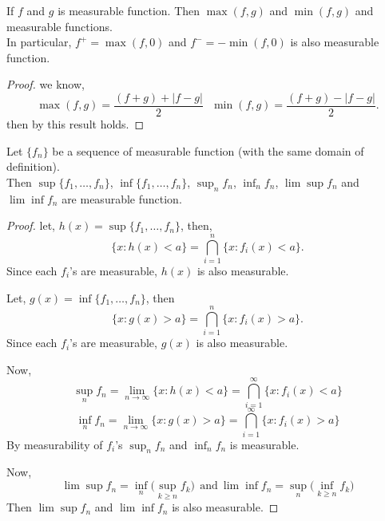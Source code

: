 \begin{corollary}
    If $f$ and  $g$ is measurable function. Then  $\max(f,g)$ and  $\min(f,g)$ and measurable functions.\\
    In particular,  $f^{+}=\max(f,0)$ and $f^{-}=-\min(f,0)$ is also measurable function.
\end{corollary}
\begin{proof}
    we know,
    \begin{equation}
        \max(f,g)=\frac{(f+g)+|f-g|}{2} \ \ \ \min(f,g)=\frac{(f+g)-|f-g|}{2}.
    \end{equation}
    then by  this result holds.
\end{proof}

\begin{theorem}
    Let $\{f_n\}$ be a sequence of measurable function (with the same domain of definition).\\
    Then  $\sup\{f_1,\ldots,f_n\}$, $\inf\{f_1,\ldots,f_n\}$, $\sup_nf_n$,  $\inf_nf_n$,
     $\lim\sup f_n$ and  $\lim\inf f_n$ are measurable function.
\end{theorem}
\begin{proof}
    let, $h(x)=\sup\{f_1,\ldots,f_n\}$, then,
    \[
        \{x:h(x)<a\}=\bigcap_{i=1}^{n}\{x:f_i(x)<a\}.
    \]
    Since each $f_i$'s are measurable,  $h(x)$ is also measurable.
    
    Let, $g(x)=\inf\{f_1,\ldots,f_n\}$, then
    \[
        \{x:g(x)>a\}=\bigcap_{i=1}^{n}\{x:f_i(x)>a\}.
    \]
    Since each $f_i$'s are measurable,  $g(x)$ is also measurable.

    Now, 
    $$\sup_n f_n=\lim_{n\to\infty}\{x:h(x)<a\}=\bigcap_{i=1}^{\infty}\{x:f_i(x)<a\}$$
    $$\inf_n f_n=\lim_{n\to\infty}\{x:g(x)>a\}=\bigcap_{i=1}^{\infty}\{x:f_i(x)>a\}$$
    By measurability of $f_i$'s  $\sup_nf_n$ and  $\inf_nf_n$ is measurable.

    Now, 
    \[
        \lim\sup f_n=\inf_n\big(\sup_{k\ge n}f_k\big) \ \ \text{and} \ \lim\inf f_n=\sup_n\big(\inf_{k\ge n}f_k\big)
    \]
    Then $\lim\sup f_n$ and  $\lim\inf f_n$ is also measurable.
\end{proof}
